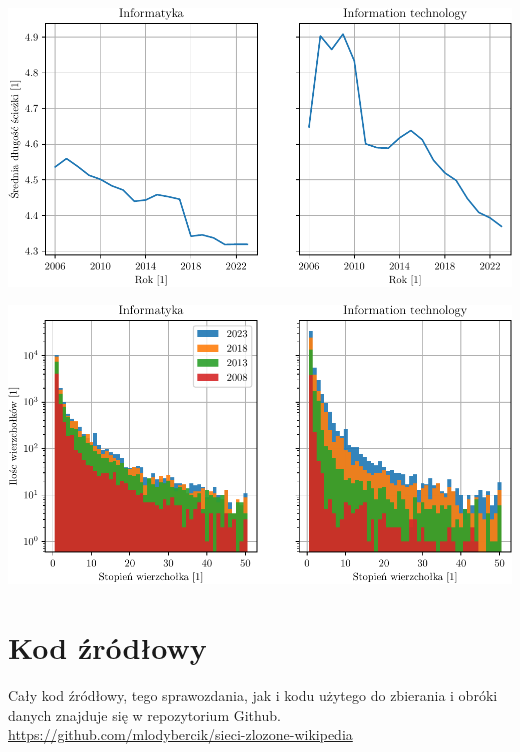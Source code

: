 \documentclass[a4paper, 12pt]{article}
\begin{document}
\begin{appendices}
\begin{center}
    \includegraphics[width=\linewidth]{figures/path_en.pdf}
    \label{fig:path_en}
\end{center}

\begin{center}
    \includegraphics[width=\linewidth]{figures/degreehist_en.pdf}
    \label{fig:degreehist_en}
\end{center}

\begin{center}
    
    \label{tab:maxmean_en}
\end{center}

\begin{center}
    
    \label{tab:joints_en}
\end{center}

\newpage

\section{Kod źródłowy}
Cały kod źródłowy, tego sprawozdania, jak i kodu użytego do zbierania i obróki danych znajduje się w repozytorium Github. \\
\noindent \url{https://github.com/mlodybercik/sieci-zlozone-wikipedia}
\end{appendices}
\end{document}

